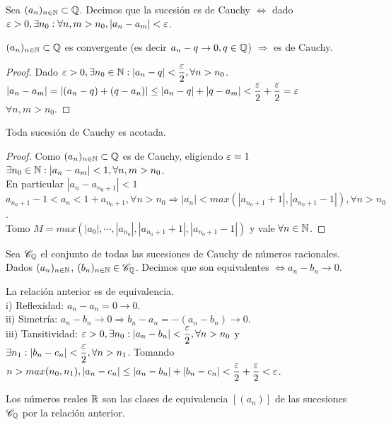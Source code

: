 \begin{definition}
  Sea $(a_n)_{n \in \mathbb{N}} \subset \mathbb{Q}$. Decimos que la sucesión es de Cauchy $\iff$ dado $\varepsilon > 0, \exists n_0 : \forall n,m > n_0, |a_n - a_m| < \varepsilon$.
\end{definition}

\begin{theorem}
  $(a_n)_{n \in \mathbb{N}} \subset \mathbb{Q}$ es convergente (es decir $a_n - q \to 0, q \in \mathbb{Q}$) $\Rightarrow$ es de Cauchy.
  \begin{proof}
    Dado $\varepsilon > 0, \exists n_0 \in \mathbb{N} : |a_n - q| < \dfrac{\varepsilon}{2}, \forall n > n_0$. \\
    $|a_n - a_m| = |(a_n - q) + (q - a_n)| \leq |a_n - q| + |q - a_m| < \dfrac{\varepsilon}{2} + \dfrac{\varepsilon}{2} = \varepsilon$ \\
    $\forall n,m > n_0$.
  \end{proof}
\end{theorem}

\begin{theorem}
  Toda sucesión de Cauchy es acotada.

  \begin{proof}
    Como $(a_n)_{n \in \mathbb{N}} \subset \mathbb{Q}$ es de Cauchy, eligiendo $\varepsilon = 1$ \\
    $\exists n_0 \in \mathbb{N} : |a_n - a_m| < 1, \forall n,m > n_0$. \\
    En particular $|a_n - a_{n_0+1}| < 1$ \\
    $a_{n_0+1} - 1 < a_n < 1 + a_{n_0+1}, \forall n > n_0 \Rightarrow |a_n| < max(|a_{n_0+1} + 1|, |a_{n_0+1} - 1|), \forall n > n_0$. \\
    Tomo $M = max(|a_0|, \cdots, |a_{n_0}|, |a_{n_0+1} + 1|, |a_{n_0+1} - 1|)$ y vale $\forall n \in \mathbb{N}$.
  \end{proof}
\end{theorem}

\begin{definition}
  Sea $\mathscr{C}_{\mathbb{Q}}$ el conjunto de todas las sucesiones de Cauchy de números racionales. Dados $(a_n)_{n \in \mathbb{N}}$, $(b_n)_{n \in \mathbb{N}} \in \mathscr{C}_{\mathbb{Q}}$. Decimos que son equivalentes $\iff a_n - b_n \to 0$.
\end{definition}

\begin{prop}
  La relación anterior es de equivalencia. \\
  i) Reflexidad: $a_n - a_n = 0 \to 0$. \\
  ii) Simetría: $a_n - b_n \to 0 \Rightarrow b_n - a_n = -(a_n-b_n) \to 0$. \\
  iii) Tansitividad: $\varepsilon > 0, \exists n_0 : |a_n - b_n| < \dfrac{\varepsilon}{2}, \forall n > n_0$
  y $\exists n_1 : |b_n - c_n| < \dfrac{\varepsilon}{2}, \forall n > n_1$. Tomando $n > max(n_0, n_1), |a_n - c_n| \leq |a_n - b_n| + |b_n - c_n| < \dfrac{\varepsilon}{2} + \dfrac{\varepsilon}{2} < \varepsilon$.
\end{prop}

\begin{definition}
  Los números reales $\mathbb{R}$ son las clases de equivalencia $[(a_n)]$ de las sucesiones $\mathscr{C}_{\mathbb{Q}}$ por la relación anterior.
\end{definition}
